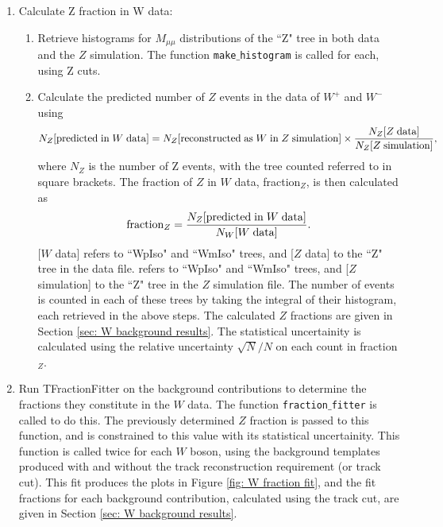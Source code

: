\documentclass[a4paper]{article}
\begin{document}
\begin{enumerate}
    \item Calculate Z fraction in W data:
    \begin{enumerate}
        \item Retrieve histograms for $M_{\mu\mu}$ distributions of the ``Z" tree in both data and the $Z$ simulation. The function \texttt{make$\_$histogram} is called for each, using Z cuts.
        \item Calculate the predicted number of $Z$ events in the data of $W^+$ and $W^-$ using
        \begin{equation}
            N_Z[{\rm predicted \; in \;} W {\rm\; data}] = N_Z[{\rm reconstructed \; as \;} W {\rm \; in \;} Z {\rm \; simulation}] \times \frac{N_Z[Z {\rm \; data}]}{N_Z[Z {\rm\; simulation}]},
        \end{equation}
        where $N_Z$ is the number of Z events, with the tree counted referred to in square brackets. The fraction of $Z$ in $W$ data, fraction$_Z$, is then calculated as
        \begin{equation}
            {\rm fraction}_Z = \frac{N_Z[{\rm predicted \; in \;} W {\rm\; data}]}{N_W[W {\rm \; data}]}.
        \end{equation}
        [$W$ data] refers to ``WpIso" and ``WmIso" trees, and [$Z$ data] to the ``Z" tree in the data file.  refers to ``WpIso" and ``WmIso" trees, and [$Z$ simulation] to the ``Z" tree in the $Z$ simulation file. \newline 
        The number of events is counted in each of these trees by taking the integral of their histogram, each retrieved in the above steps. \newline
        The calculated $Z$ fractions are given in Section \ref{sec: W background results}.
        The statistical uncertainity is calculated using the relative uncertainty $\sqrt{N}/N$ on each count in fraction$_Z$.
    \end{enumerate}
    
    \item Run TFractionFitter on the background contributions to determine the fractions they constitute in the $W$ data. The function \texttt{fraction$\_$fitter} is called to do this. The previously determined $Z$ fraction is passed to this function, and is constrained to this value with its statistical uncertainity. This function is called twice for each $W$ boson, using the background templates produced with and without the track reconstruction requirement (or track cut).\newline
    This fit produces the plots in Figure \ref{fig: W fraction fit}, and the fit fractions for each background contribution, calculated using the track cut, are given in Section \ref{sec: W background results}.
    

\end{enumerate}
\end{document}
